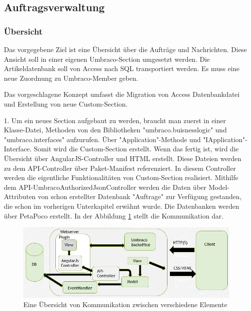 \subsection{Auftragsverwaltung}

\subsubsection{Übersicht}

Das vorgegebene Ziel ist eine Übersicht über die Aufträge und Nachrichten. Diese Ansicht soll in einer eigenen Umbraco-Section umgesetzt werden. Die Artikeldatenbank soll von Access nach SQL transportiert werden. Es muss eine neue Zuordnung zu Umbraco-Member geben.

Das vorgeschlagene Konzept umfasst die Migration von Access Datenbankdatei und Erstellung von neue Custom-Section. 

1. Um ein neues Section aufgebaut zu werden, braucht man zuerst in einer Klasse-Datei, Methoden von den Bibliotheken "umbraco.buisnesslogic" und "umbraco.interfaces" aufzurufen. Über "Application"-Methode und "IApplication"-Interface. Somit wird die Custom-Section erstellt. Wenn das fertig ist, wird die Übersicht über AngularJS-Controller und HTML erstellt. Diese Dateien werden zu dem API-Controller über Paket-Manifest referenziert. In diesem Controller werden die eigentliche Funktionalitäten von Custom-Section realisiert. Mithilfe dem API-UmbracoAuthorizedJsonController werden die Daten über Model-Attributen von schon erstellter Datenbank "Auftrage" zur Verfügung gestanden, die schon im vorherigen Unterkapitel erwähnt wurde. Die Datenbanken werden über PetaPoco erstellt. In der Abbildung \ref{fig:CustomSection}  stellt die Kommunikation dar. 
 
 \begin{figure}[h]
 	\centering
 	\includegraphics[width=1\linewidth]{Graphics/CustomSection.png}
 	\caption[Shop]{Eine Übersicht von Kommunikation zwischen verschiedene Elemente}
 	\label{fig:CustomSection}
 \end{figure}
 
